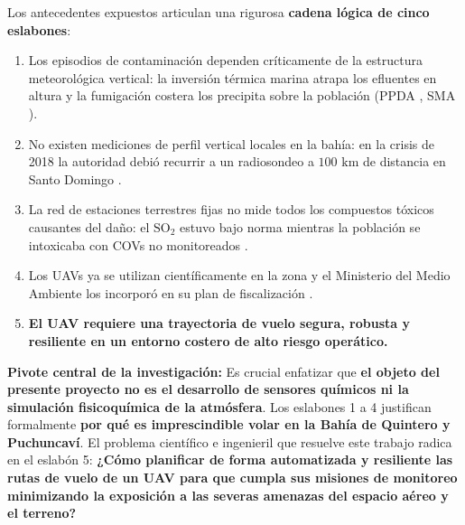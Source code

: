 \documentclass[letterpaper,12pt]{article}
\begin{document}
Los antecedentes expuestos articulan una rigurosa \textbf{cadena lógica de cinco eslabones}:
\begin{enumerate}
    \item Los episodios de contaminación dependen críticamente de la estructura meteorológica vertical: la inversión térmica marina atrapa los efluentes en altura y la fumigación costera los precipita sobre la población (PPDA \cite{ppda_concon}, SMA \cite{sma_dictuc}).
    \item No existen mediciones de perfil vertical locales en la bahía: en la crisis de 2018 la autoridad debió recurrir a un radiosondeo a $100\text{ km}$ de distancia en Santo Domingo \cite{sma_dictuc}.
    \item La red de estaciones terrestres fijas no mide todos los compuestos tóxicos causantes del daño: el $\text{SO}_2$ estuvo bajo norma mientras la población se intoxicaba con COVs no monitoreados \cite{sma_dictuc,cr2_informe,cifuentes}.
    \item Los UAVs ya se utilizan científicamente en la zona \cite{cr2_informe} y el Ministerio del Medio Ambiente los incorporó en su plan de fiscalización \cite{mma_drones}.
    \item \textbf{El UAV requiere una trayectoria de vuelo segura, robusta y resiliente en un entorno costero de alto riesgo operático.}
\end{enumerate}

\noindent \textbf{Pivote central de la investigación:} Es crucial enfatizar que \textbf{el objeto del presente proyecto no es el desarrollo de sensores químicos ni la simulación fisicoquímica de la atmósfera}. Los eslabones 1 a 4 justifican formalmente \textbf{por qué es imprescindible volar en la Bahía de Quintero y Puchuncaví}. El problema científico e ingenieril que resuelve este trabajo radica en el eslabón 5: \textbf{¿Cómo planificar de forma automatizada y resiliente las rutas de vuelo de un UAV para que cumpla sus misiones de monitoreo minimizando la exposición a las severas amenazas del espacio aéreo y el terreno?}
\end{document}
